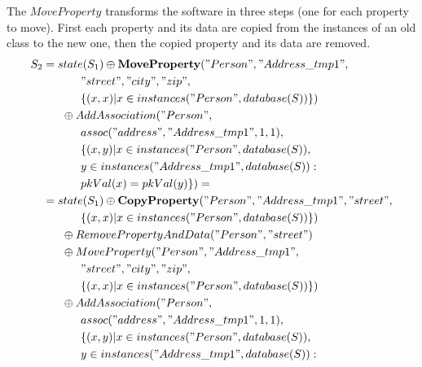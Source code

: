 \documentclass[11pt]{article}
\begin{document}
\newpage
The $MoveProperty$ transforms the software in three steps (one for each property to move). First each property and its data are copied from the instances of an old class to the new one, then the copied property and its data are removed.
\begin{align*}
	S_2 &= state(S_1) \oplus \mathbf{MoveProperty}("Person", "Address\_tmp1", \\ 
& \;\;\;\;\;\; \;\;\;\;\;\; "street", "city", "zip", \\
& \;\;\;\;\;\; \;\;\;\;\;\;    \{(x,x) | x \in instances("Person", database(S))\}) \\
&  \;\;\;\;\;\; \oplus AddAssociation("Person", \\ 
& \;\;\;\;\;\;\;\;\;\;\;\; assoc("address", "Address\_tmp1", 1, 1),\\ 
& \;\;\;\;\;\;\;\;\;\;\;\; \{(x,y)| x \in instances("Person", database(S)), \\
& \;\;\;\;\;\; \;\;\;\;\;\; y \in instances("Address\_tmp1", database(S)) : \\ 
& \;\;\;\;\;\;\;\;\;\;\;\; pkVal(x) = pkVal(y) \}) = \\
& = state(S_1) \oplus \mathbf{CopyProperty}("Person", "Address\_tmp1" , "street", \\
& \;\;\;\;\;\;\;\;\;\;\;\; \{(x,x) | x \in instances("Person", database(S))\}) \\
& \;\;\;\;\;\; \oplus RemovePropertyAndData("Person", "street") \\
& \;\;\;\;\;\; \oplus MoveProperty("Person", "Address\_tmp1", \\ 
& \;\;\;\;\;\; \;\;\;\;\;\; "street", "city", "zip", \\
& \;\;\;\;\;\; \;\;\;\;\;\;    \{(x,x) | x \in instances("Person", database(S))\}) \\
&  \;\;\;\;\;\; \oplus AddAssociation("Person", \\ 
& \;\;\;\;\;\;\;\;\;\;\;\; assoc("address", "Address\_tmp1", 1, 1),\\ 
& \;\;\;\;\;\;\;\;\;\;\;\; \{(x,y)| x \in instances("Person", database(S)), \\
& \;\;\;\;\;\; \;\;\;\;\;\; y \in instances("Address\_tmp1", database(S)) : \\ 
\end{align*}
\end{document}
